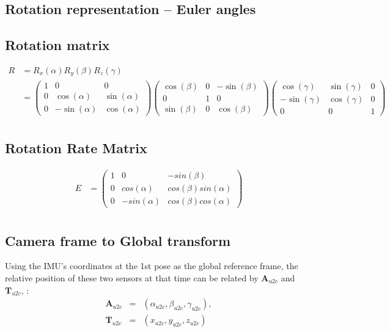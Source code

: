 \documentclass[12pt]{article}   %
\begin{document}
\newpage 
\begin{appendices}
	\section{Rotation representation -- Euler angles}
	
	\subsection{Rotation matrix}
	\begin{align*}
		R &=R_{x}(\alpha) R_{y}(\beta) R_{z}(\gamma) \nonumber \\
		  &= \begin{pmatrix} 
				1 & 0 & 0 
				\\ 0 & \cos(\alpha) & \sin(\alpha) 
				\\ 0 & -\sin(\alpha) & \cos(\alpha) 
			\end{pmatrix} 
			\begin{pmatrix} 
				\cos(\beta) & 0 & -\sin(\beta) \\ 
				0 & 1 & 0 \\ 
				\sin(\beta) &  0 & \cos(\beta) 
			\end{pmatrix} 
			\begin{pmatrix} 
				\cos(\gamma) & \sin(\gamma) & 0 
				\\ -\sin(\gamma) & \cos(\gamma) &  0 
				\\ 0 & 0 & 1 
			\end{pmatrix} \\	
		\end{align*}
		
	\subsection{Rotation Rate Matrix}
	\begin{align*}
	E &= \begin{pmatrix} 
			1 & 0 & -sin(\beta) \\ 
			0 & cos(\alpha) & cos(\beta)sin(\alpha) \\ 
			0 & -sin(\alpha) & cos(\beta)cos(\alpha) 
		 \end{pmatrix} \\
	\end{align*}
	
	\subsection{Camera frame to Global transform}	
Using the IMU's coordinates at the 1st pose as the global reference frame, the relative position of these two sensors at that time can be related by $\textbf{A}_{u2c}$ and $\textbf{T}_{u2c}$, : 
\begin{eqnarray*}   %
	\textbf{A}_{u2c} & = & (\alpha_{u2c}, \beta_{u2c}, \gamma_{u2c}), \\
	\textbf{T}_{u2c} & = & (x_{u2c}, y_{u2c}, z_{u2c})
\end{eqnarray*}


\end{appendices}
\end{document}
